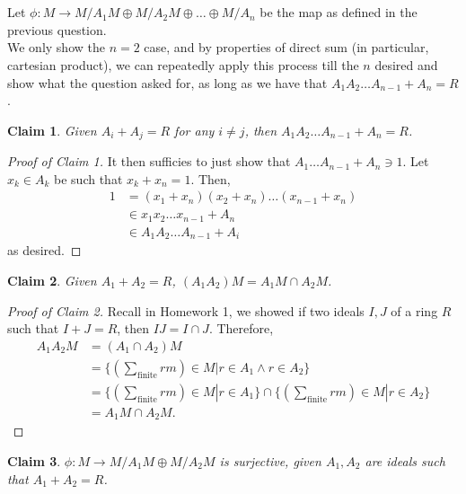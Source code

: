 \documentclass{article}
\theoremstyle{plain}
\newtheorem{claim}{Claim}
\begin{document}
\section{}
Let $\phi:M\to M/A_{1}M\oplus M/A_{2}M\oplus\ldots\oplus M/A_{n}$ be the map as defined
in the previous question.
\\
We only show the $n=2$ case, and by properties of direct sum (in particular,
cartesian product), we can repeatedly apply this process till the $n$ desired
and show what the question asked for, as long as we have that
$A_{1}A_{2}\ldots A_{n-1}+A_{n}=R$.
\begin{claim} %
  Given $A_{i}+A_{j}=R$ for any $i\ne j$, then $A_{1}A_{2}\ldots A_{n-1}+A_{n}=R$.
\end{claim}
\begin{proof}[Proof of Claim 1]
  It then sufficies to just show that $A_{1}\ldots A_{n-1}+A_{n}\ni1$. Let
  $x_{k}\in A_{k}$ be such that $x_{k} + x_{n}=1$. Then,
  \begin{align*}
    1&=(x_{1}+x_{n})(x_{2}+x_{n})\ldots(x_{n-1}+x_{n})\\
       &\in x_{1}x_{2}\ldots x_{n-1} + A_{n}\\
       &\in A_{1}A_{2}\ldots A_{n-1} + A_{i}
  \end{align*}
  as desired.
\end{proof}
\begin{claim} %
  Given $A_{1}+A_{2}=R$, $(A_{1}A_{2})M=A_{1}M\cap A_{2}M$.
\end{claim}
\begin{proof}[Proof of Claim 2]
  Recall in Homework 1, we showed if two ideals $I,J$ of a ring $R$ such that
  $I+J=R$, then $IJ=I\cap J$. Therefore,
  \begin{align*}
    A_{1}A_{2}M &= (A_{1}\cap A_{2})M\\
    &=\{(\sum_{\text{finite}}rm) \in M|r\in A_{1}\wedge r\in A_{2}\}\\
    &=\{(\sum_{\text{finite}}rm) \in M|r\in A_{1}\}\cap\{(\sum_{\text{finite}}rm) \in M|r\in A_{2}\}\\
    &=A_{1}M\cap A_{2}M.
  \end{align*}
\end{proof}
\begin{claim} %
  $\phi:M\to M/A_{1}M\oplus M/A_{2}M$ is surjective, given $A_{1},A_{2}$ are ideals such that $A_{1}+A_{2}=R$.
\end{claim}
\end{document}
